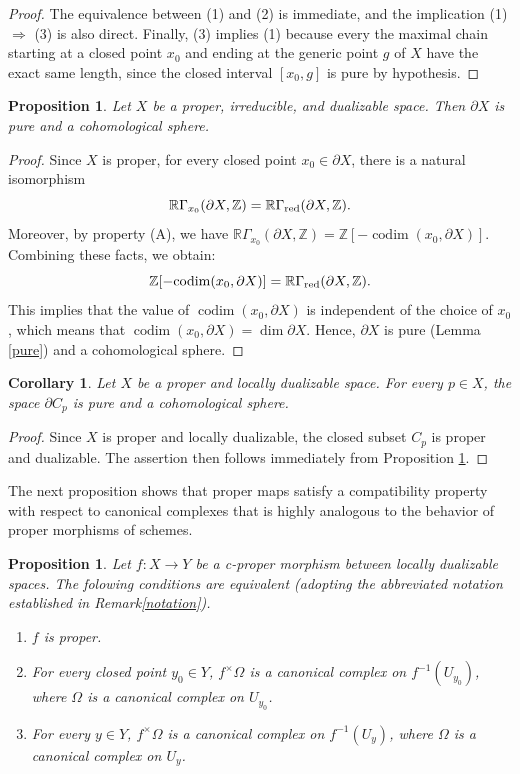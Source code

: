 \documentclass[amssymb,amscd,11pt,20pt]{amsart}
\newcommand{\codim}{{\operatorname{codim}}}
\newcommand{\ZZ}{{\mathbb Z}}
\newcommand{\RR}{\mathbb R}
\newcommand{\0}{\mathbf 0}
\theoremstyle{plain}
\newtheorem{cor}[thm]{Corollary}
\newtheorem{prop}[thm]{Proposition}
\numberwithin{equation}{thm}
\begin{document}
\begin{proof} The equivalence between (1) and (2) is immediate, and the implication (1) $\Rightarrow $ (3) is also direct. Finally, (3) implies (1) because every the maximal chain starting at a closed point $x_0$ and ending at the generic point $g$ of $X$  have the exact same length, since the closed interval $[x_0,g]$ is pure by hypothesis.
\end{proof}

\begin{prop}\label{prop+irred} Let $X$ be a proper, irreducible, and dualizable space. Then $\partial X$ is pure and a cohomological sphere. 
\end{prop}

\begin{proof} Since $X$ is proper, for every closed point $x_0\in\partial X$, there is a natural isomorphism
\[\RR\Gamma_{x_0}(\partial X,\ZZ)=\RR\Gamma_{\text{\rm red}}(\partial X,\ZZ).\]
Moreover, by property (A), we have $\RR\Gamma_{x_0}(\partial X,\ZZ)=\ZZ[-\codim (x_0,\partial X)]$. Combining these facts, we obtain:
\[ \ZZ[-\codim (x_0,\partial X)] = \RR\Gamma_{\text{\rm red}}(\partial X,\ZZ).\] This implies that the value of  $\codim (x_0,\partial X)$ is independent of the choice of $x_0$, which means that  $\codim (x_0,\partial X)=\dim\partial X$. Hence, $\partial X$ is pure (Lemma \ref{pure})   and a cohomological sphere.
\end{proof}

\begin{cor}\label{pro+irred2} Let $X$ be a proper and locally dualizable space. For every $p\in X$, the space $\partial C_p$ is pure and a cohomological sphere.
\end{cor}

\begin{proof} Since $X$ is proper and locally dualizable, the closed subset  $C_p$ is proper and dualizable. The assertion then follows immediately from Proposition \ref{prop+irred}. 
\end{proof}

The next proposition shows that proper maps satisfy a compatibility property with respect to canonical complexes that is highly analogous to the behavior of proper morphisms of schemes.


\begin{prop}\label{proper-canonical} Let $f\colon X\to Y$ be a c-proper morphism between locally dualizable spaces. The folowing conditions are equivalent (adopting the abbreviated notation established in Remark\ref{notation}).
\begin{enumerate}
\item $f$ is proper.
\item For every closed point $y_0\in Y$, $f^\times \Omega$ is a canonical complex on $f^{-1}(U_{y_0})$, where $\Omega$ is a canonical complex on  $U_{y_0}$. 
\item For every $y\in Y$, $ f^\times \Omega$ is a canonical complex on $f^{-1}(U_y)$, where $\Omega$ is a canonical complex on  $U_y$. 

\end{enumerate}
\end{prop}
\end{document}
